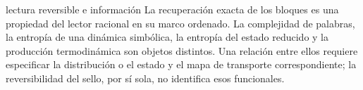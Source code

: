 \begin{apunte}{lectura reversible e información}
La recuperación exacta de los bloques es una propiedad del lector
racional en su marco ordenado. La complejidad de palabras, la entropía
de una dinámica simbólica, la entropía del estado reducido y la
producción termodinámica son objetos distintos. Una relación entre
ellos requiere especificar la distribución o el estado y el mapa de
transporte correspondiente; la reversibilidad del sello, por sí sola,
no identifica esos funcionales.
\end{apunte}
